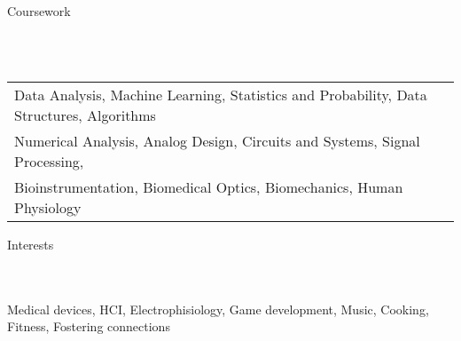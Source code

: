 \documentclass{article}
\newcommand{\lineunder} {
    \vspace*{-8pt} \\
    \hspace*{-18pt} \hrulefill \\
}
\newcommand{\header} [1] {
    {\hspace*{-18pt}\vspace*{6pt} \Large{#1} }
    \vspace*{-6pt} 
    \lineunder
}
\begin{document}
%

\header{Coursework}
\vspace{1mm}
\begin{tabular}{ l l }
	Data Analysis, Machine Learning, Statistics and Probability, Data Structures, Algorithms \\
	Numerical Analysis, Analog Design, Circuits and Systems, Signal Processing, \\
	Bioinstrumentation, Biomedical Optics, Biomechanics, Human Physiology
\end{tabular}

\header{Interests}
Medical devices, HCI, Electrophisiology, Game development, Music, Cooking, Fitness, Fostering connections
\end{document}
